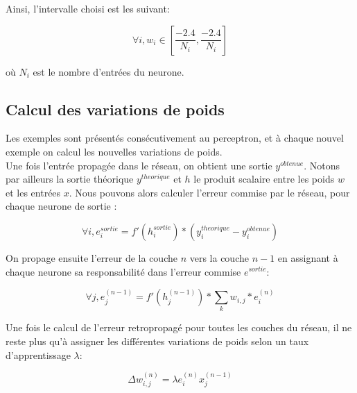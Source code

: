 \documentclass[a4paper,oneside]{report}
\begin{document}
                    Ainsi, l'intervalle choisi est les suivant:

                    \begin{equation}
                        \forall i, w_{i}\in [\frac{-2.4}{N_{i}}, \frac{-2.4}{N_{i}}]
                    \end{equation}

                    où $N_{i}$ est le nombre d'entrées du neurone.


                \subsection{Calcul des variations de poids}

                    Les exemples sont présentés consécutivement au perceptron, et à chaque nouvel exemple on calcul les nouvelles variations de poids.\\

                    Une fois l'entrée propagée dans le réseau, on obtient une sortie $y^{obtenue}$. Notons par ailleurs la sortie théorique $y^{theorique}$ et $h$ le produit scalaire entre les poids $w$ et les entrées $x$. Nous pouvons alors calculer l'erreur commise par le réseau, pour chaque neurone de sortie :

                    \begin{equation}
                        \forall i, e_{i}^{sortie} = f'(h_{i}^{sortie})*(y_{i}^{theorique}-y_{i}^{obtenue})
                    \end{equation}

                    On propage ensuite l'erreur de la couche $n$ vers la couche $n-1$ en assignant à chaque neurone sa responsabilité dans l'erreur commise $e^{sortie}$:

                    \begin{equation}
                        \forall j, e^{(n-1)}_{j} = f'(h_{j}^{(n-1)})*\sum_{k} w_{i,j}*e_{i}^{(n)}
                    \end{equation}

                    Une fois le calcul de l'erreur retropropagé pour toutes les couches du réseau, il ne reste plus qu'à assigner les différentes variations de poids selon un taux d'apprentissage $\lambda$:

                    \begin{equation}
                        \Delta w_{i,j}^{(n)} = \lambda e_{i}^{(n)}x_{j}^{(n-1)}
                    \end{equation}
\end{document}
